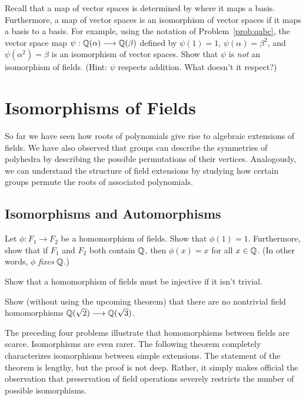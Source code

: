\begin{problem}
    Recall that a map of vector spaces is determined by where it maps a basis. Furthermore, a map of vector spaces is an isomorphism of vector spaces if it maps a basis to a basis. For example, using the notation of Problem~\ref{prob:qabc}, the vector space map $\psi:\mathbb{Q}(\alpha) \longrightarrow \mathbb{Q}(\beta)$ defined by $\psi(1)=1$, $\psi(\alpha)=\beta^2$, and $\psi(\alpha^2)=\beta$ is an isomorphism of vector spaces. Show that $\psi$ is \textit{not} an isomorphism of fields. (Hint: $\psi$ respects addition. What doesn't it respect?)
\end{problem}

\chapter{Isomorphisms of Fields}\label{chap:isofields}

So far we have seen how roots of polynomials give rise to algebraic extensions of fields. We have also observed that groups can describe the symmetries of polyhedra by describing the possible permutations of their vertices. Analogously, we can understand the structure of field extensions by studying how certain groups permute the roots of associated polynomials.

\section{Isomorphisms and Automorphisms}

\begin{problem}
Let $\phi: F_1 \longrightarrow F_2$ be a homomorphism of fields. Show that $\phi(1) = 1$. Furthermore, show that if $F_1$ and $F_2$ both contain $\mathbb{Q}$, then $\phi(x) = x$ for all $x\in \mathbb{Q}$. (In other words, $\phi$ \textit{fixes} $\mathbb{Q}$.)
\end{problem}

\begin{problem}
Show that a homomorphism of fields must be injective if it isn't trivial.
\end{problem}

\begin{problem}
    Show (without using the upcoming theorem) that there are no nontrivial field homomorphisms $\mathbb{Q}(\sqrt{2}) \longrightarrow \mathbb{Q}(\sqrt{3})$.
\end{problem}

The preceding four problems illustrate that homomorphisms between fields are scarce. Isomorphisms are even rarer. The following theorem completely characterizes isomorphisms between simple extensions. The statement of the theorem is lengthy, but the proof is not deep. Rather, it simply makes official the observation that preservation of field operations severely restricts the number of possible isomorphisms.

